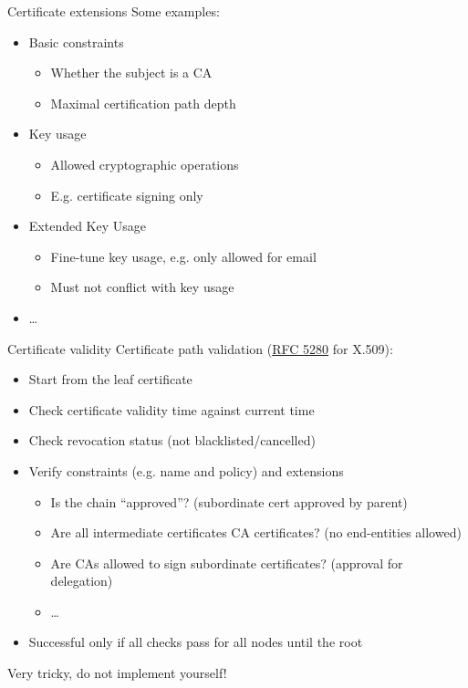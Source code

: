 \begin{frame}{Certificate extensions}
  Some examples:
  \begin{itemize}[<+(1)->]
    \item Basic constraints
    \begin{itemize}
      \item Whether the subject is a CA
      \item Maximal certification path depth
    \end{itemize}
    \item Key usage
    \begin{itemize}
      \item Allowed cryptographic operations
      \item E.g. certificate signing only
    \end{itemize}
    \item Extended Key Usage
    \begin{itemize}
      \item Fine-tune key usage, e.g. only allowed for email
      \item Must not conflict with key usage
    \end{itemize}
    \item \dots
  \end{itemize}
\end{frame}

\begin{frame}{Certificate validity}
  \pause
  Certificate path validation (\href{https://datatracker.ietf.org/doc/html/rfc5280}{RFC 5280} for X.509):
  \begin{itemize}[<+(1)->]
    \item Start from the leaf certificate
    \item Check certificate validity time against current time
    \item Check revocation status (not blacklisted/cancelled)
    \item Verify constraints (e.g. name and policy) and extensions
    \begin{itemize}
      \item Is the chain \enquote{approved}? (subordinate cert approved by parent)
      \item Are all intermediate certificates CA certificates? (no end-entities allowed)
      \item Are CAs allowed to sign subordinate certificates? (approval for delegation)
      \item \dots
    \end{itemize}
    \item Successful only if all checks pass for all nodes until the root
  \end{itemize}

  \pause
  Very tricky, do not implement yourself!
\end{frame}

